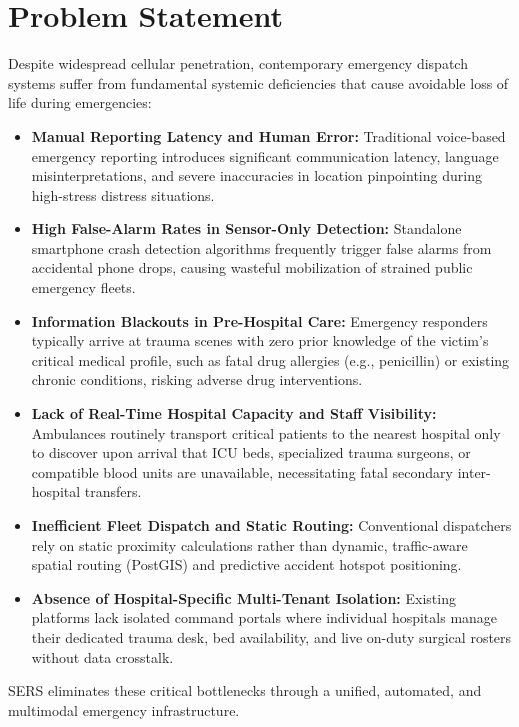 \documentclass[12pt,a4paper]{article}
\begin{document}
\clearpage
\section{Problem Statement}
Despite widespread cellular penetration, contemporary emergency dispatch systems suffer from fundamental systemic deficiencies that cause avoidable loss of life during emergencies:

\begin{itemize}
    \item \textbf{Manual Reporting Latency and Human Error:} Traditional voice-based emergency reporting introduces significant communication latency, language misinterpretations, and severe inaccuracies in location pinpointing during high-stress distress situations.
    \item \textbf{High False-Alarm Rates in Sensor-Only Detection:} Standalone smartphone crash detection algorithms frequently trigger false alarms from accidental phone drops, causing wasteful mobilization of strained public emergency fleets.
    \item \textbf{Information Blackouts in Pre-Hospital Care:} Emergency responders typically arrive at trauma scenes with zero prior knowledge of the victim's critical medical profile, such as fatal drug allergies (e.g., penicillin) or existing chronic conditions, risking adverse drug interventions.
    \item \textbf{Lack of Real-Time Hospital Capacity and Staff Visibility:} Ambulances routinely transport critical patients to the nearest hospital only to discover upon arrival that ICU beds, specialized trauma surgeons, or compatible blood units are unavailable, necessitating fatal secondary inter-hospital transfers.
    \item \textbf{Inefficient Fleet Dispatch and Static Routing:} Conventional dispatchers rely on static proximity calculations rather than dynamic, traffic-aware spatial routing (PostGIS) and predictive accident hotspot positioning.
    \item \textbf{Absence of Hospital-Specific Multi-Tenant Isolation:} Existing platforms lack isolated command portals where individual hospitals manage their dedicated trauma desk, bed availability, and live on-duty surgical rosters without data crosstalk.
\end{itemize}

SERS eliminates these critical bottlenecks through a unified, automated, and multimodal emergency infrastructure.
\end{document}
